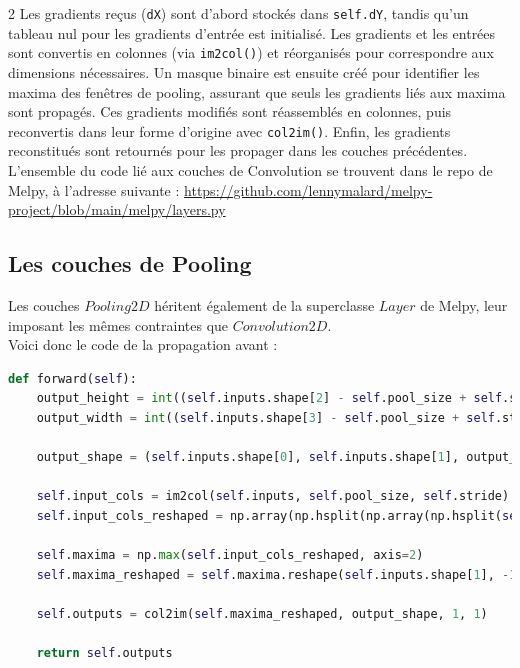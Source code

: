 \begin{multicols}{2}
Les gradients reçus (\texttt{dX}) sont d’abord stockés dans \texttt{self.dY}, tandis qu’un tableau nul pour les gradients 
d’entrée est initialisé. Les gradients et les entrées sont convertis en colonnes (via \texttt{im2col()}) et 
réorganisés pour correspondre aux dimensions nécessaires. Un masque binaire est ensuite créé pour identifier les maxima 
des fenêtres de pooling, assurant que seuls les gradients liés aux maxima sont propagés. Ces gradients 
modifiés sont réassemblés en colonnes, puis reconvertis dans leur forme d’origine avec \texttt{col2im()}. 
Enfin, les gradients reconstitués sont retournés pour les propager dans les couches précédentes.\\

L'ensemble du code lié aux couches de Convolution se trouvent dans le repo de Melpy, à l'adresse suivante : \url{https://github.com/lennymalard/melpy-project/blob/main/melpy/layers.py}

\subsection{Les couches de Pooling}

Les couches $Pooling2D$ héritent également de la superclasse $Layer$ 
de Melpy, leur imposant les mêmes contraintes que $Convolution2D$.\\

Voici donc le code de la propagation avant : \\

\begin{lstlisting}[language=Python]
def forward(self):
    output_height = int((self.inputs.shape[2] - self.pool_size + self.stride) // self.stride)
    output_width = int((self.inputs.shape[3] - self.pool_size + self.stride) // self.stride)

    output_shape = (self.inputs.shape[0], self.inputs.shape[1], output_height, output_width)

    self.input_cols = im2col(self.inputs, self.pool_size, self.stride)
    self.input_cols_reshaped = np.array(np.hsplit(np.array(np.hsplit(self.input_cols, self.inputs.shape[0])), self.inputs.shape[1]))

    self.maxima = np.max(self.input_cols_reshaped, axis=2)
    self.maxima_reshaped = self.maxima.reshape(self.inputs.shape[1], -1)

    self.outputs = col2im(self.maxima_reshaped, output_shape, 1, 1)

    return self.outputs
\end{lstlisting}
\hfill\break


\end{multicols}

